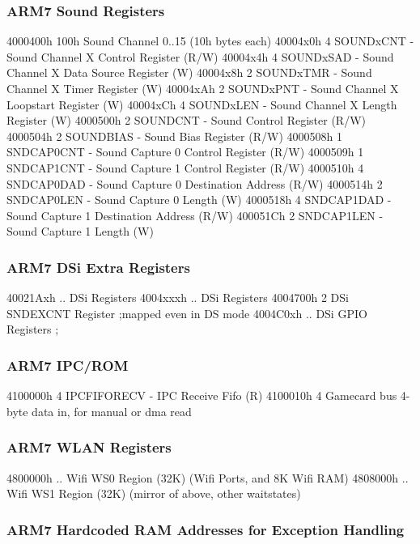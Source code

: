 \documentclass[11pt,a4paper]{proc}
\begin{document}
\begin{flushleft}
\subsubsection{ARM7 Sound Registers}

  4000400h 100h Sound Channel 0..15 (10h bytes each)
  40004x0h  4   SOUNDxCNT - Sound Channel X Control Register (R/W)
  40004x4h  4   SOUNDxSAD - Sound Channel X Data Source Register (W)
  40004x8h  2   SOUNDxTMR - Sound Channel X Timer Register (W)
  40004xAh  2   SOUNDxPNT - Sound Channel X Loopstart Register (W)
  40004xCh  4   SOUNDxLEN - Sound Channel X Length Register (W)
  4000500h  2   SOUNDCNT - Sound Control Register (R/W)
  4000504h  2   SOUNDBIAS - Sound Bias Register (R/W)
  4000508h  1   SNDCAP0CNT - Sound Capture 0 Control Register (R/W)
  4000509h  1   SNDCAP1CNT - Sound Capture 1 Control Register (R/W)
  4000510h  4   SNDCAP0DAD - Sound Capture 0 Destination Address (R/W)
  4000514h  2   SNDCAP0LEN - Sound Capture 0 Length (W)
  4000518h  4   SNDCAP1DAD - Sound Capture 1 Destination Address (R/W)
  400051Ch  2   SNDCAP1LEN - Sound Capture 1 Length (W)

\subsubsection{ARM7 DSi Extra Registers}

  40021Axh  ..  DSi Registers
  4004xxxh  ..  DSi Registers
  4004700h  2   DSi SNDEXCNT Register  ;mapped even in DS mode
  4004C0xh  ..  DSi GPIO Registers     ;

\subsubsection{ARM7 IPC/ROM}

  4100000h  4   IPCFIFORECV - IPC Receive Fifo (R)
  4100010h  4   Gamecard bus 4-byte data in, for manual or dma read

\subsubsection{ARM7 WLAN Registers}

  4800000h  ..  Wifi WS0 Region (32K) (Wifi Ports, and 8K Wifi RAM)
  4808000h  ..  Wifi WS1 Region (32K) (mirror of above, other waitstates)

\subsubsection{ARM7 Hardcoded RAM Addresses for Exception Handling}


\end{flushleft}
\end{document}
